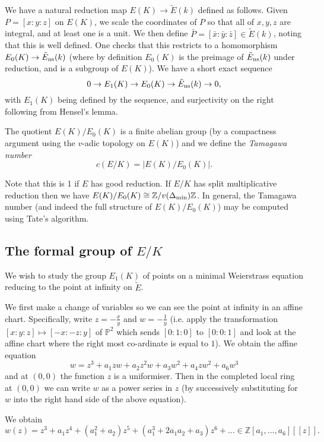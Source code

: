 \documentclass[12pt]{amsart}
\numberwithin{equation}{section}
\theoremstyle{remark}
\theoremstyle{definition}
\theoremstyle{definition}
\theoremstyle{definition}
\theoremstyle{definition}
\theoremstyle{definition}
\theoremstyle{definition}
\theoremstyle{definition}
\begin{document}
We have a natural reduction map $E(K)\rightarrow \tilde{E}(k)$ defined as follows. Given $P=[x:y:z]$ on $E(K)$, we scale the coordinates of $P$ so that all of $x,y,z$ are integral, and at least one is a unit. We then define $\bar{P}=[\bar{x}:\bar{y}:\bar{z}]\in \tilde{E}(k)$, noting that this is well defined. One checks that this restricts to a homomorphism $E_0(K)\rightarrow \tilde{E}_{\textup{ns}}(k)$ (where by definition $E_0(K)$ is the preimage of $\tilde{E}_{\textup{ns}}(k)$ under reduction, and is a subgroup of $E(K)$). We have a short exact sequence
\[0\rightarrow E_1(K)\rightarrow E_0(K)\rightarrow \tilde{E}_{\textup{ns}}(k)\rightarrow 0,\]
with $E_1(K)$ being defined by the sequence, and surjectivity on the right following from Hensel's lemma.

The quotient $E(K)/E_0(K)$ is a finite abelian group (by a compactness argument using the $v$-adic topology on $E(K)$) and we define the \textit{Tamagawa number} 
\[c(E/K)=|E(K)/E_0(K)|.\]

Note that this is 1 if $E$ has good reduction. If $E/K$ has split multiplicative reduction then we have $E(K)/E_0(K)\cong \mathbb{Z}/v(\Delta_{\textup{min}})\mathbb{Z}$. In general, the Tamagawa number (and indeed the full structure of $E(K)/E_0(K)$) may be computed using Tate's algorithm. 

\subsection{The formal group of $E/K$}

We wish to study the group $E_1(K)$ of points on a minimal Weierstrass equation reducing to the point at infinity on $\tilde{E}$. 

We first make a change of variables so we can see the point at infinity in an affine chart. Specifically, write $z=-\frac{x}{y}$ and $w=-\frac{1}{y}$ (i.e. apply the transformation $[x:y:z]\mapsto [-x:-z:y]$ of $\mathbb{P}^2$ which sends $[0:1:0]$ to $[0:0:1]$ and  look at the affine chart where the right most co-ardinate is equal to $1$). We obtain the affine equation
\[w=z^3+a_1zw+a_2z^2w+a_3w^2+a_4zw^2+a_6w^3\]
and at $(0,0)$ the function $z$ is a uniformiser. Then in the completed local ring at $(0,0)$ we can write $w$ as a power series in $z$ (by successively substituting for $w$ into the right hand side of the above equation). 

We obtain
\[w(z)=z^3+a_1z^4+(a_1^2+a_2)z^5+(a_1^3+2a_1a_2+a_3)z^6+...\in \mathbb{Z}[a_1,...,a_6][[z]].\]
\end{document}
